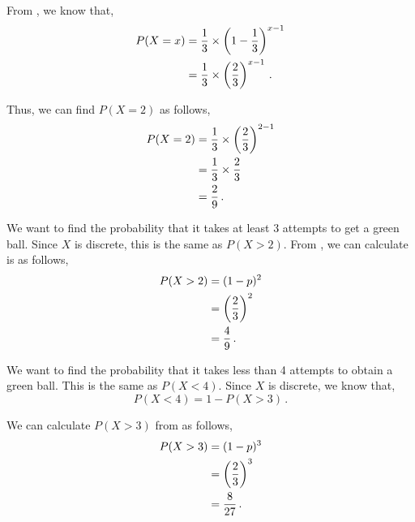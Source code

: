 \begin{subquestions}
\begin{subsubquestions}
\subsubquestion

\begin{subsubsubquestions}
	
\subsubsubquestion

From , we know that,
\begin{align}
	P(X = x) & = \frac{1}{3} \times \left(1-\frac{1}{3} \right)^{x-1} \nonumber \\
	         & = \frac{1}{3} \times \left(\frac{2}{3} \right)^{x-1} \,.
\end{align}	
	
Thus, we can find $P(X=2)$ as follows,
\begin{align}
	P(X=2) & = \frac{1}{3} \times \left(\frac{2}{3} \right)^{2-1} \nonumber \\
	       & = \frac{1}{3} \times \frac{2}{3}  \nonumber \\
	       & = \frac{2}{9} \,.
\end{align}


\subsubsubquestion

We want to find the probability that it takes at least 3 attempts to get a green ball. Since $X$ is discrete, this is the same as $P(X > 2).$ From , we can calculate is as follows,
\begin{align}
	P(X > 2) & = (1-p)^2 \nonumber \\
	            & = \left(\frac{2}{3}\right)^2 \nonumber \\
	            & = \frac{4}{9} \,.
\end{align}


\subsubsubquestion

We want to find the probability that it takes less than 4 attempts to obtain a green ball. This is the same as $P(X < 4)$. Since $X$ is discrete, we know that,
\begin{equation}
	P(X < 4) = 1 - P(X > 3) \,.
\end{equation}

We can calculate $P(X > 3)$ from  as follows,
\begin{align}
	P(X > 3) & = (1-p)^3 \nonumber \\
		   	 & = \left(\frac{2}{3}\right)^3 \nonumber \\
			 & = \frac{8}{27} \,.
\end{align}


\end{subsubsubquestions}
\end{subsubquestions}
\end{subquestions}
